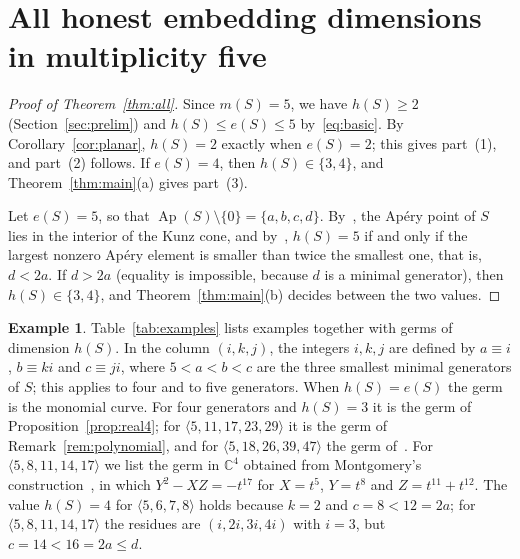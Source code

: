 \documentclass{amsart}
\theoremstyle{definition}
\newtheorem{example}[theorem]{Example}
\theoremstyle{remark}
\numberwithin{equation}{section}
\newcommand{\C}{\mathbb{C}}
\newcommand{\Ap}{\operatorname{Ap}}
\newcommand{\gen}[1]{\langle #1\rangle}
\begin{document}
\section{All honest embedding dimensions in multiplicity five}\label{sec:all}

\begin{proof}[Proof of Theorem~\textup{\ref{thm:all}}]
Since $m(S)=5$, we have $h(S)\ge2$ (Section~\ref{sec:prelim}) and $h(S)\le e(S)\le5$ by~\eqref{eq:basic}. By Corollary~\ref{cor:planar}, $h(S)=2$ exactly when $e(S)=2$; this gives part~(1), and part~(2) follows. If $e(S)=4$, then $h(S)\in\{3,4\}$, and Theorem~\ref{thm:main}(a) gives part~(3).

Let $e(S)=5$, so that $\Ap(S)\setminus\{0\}=\{a,b,c,d\}$. By~\cite[Proposition~1]{Mon}, the Ap\'ery point of $S$ lies in the interior of the Kunz cone, and by~\cite[Theorem~2]{Mon}, $h(S)=5$ if and only if the largest nonzero Ap\'ery element is smaller than twice the smallest one, that is, $d<2a$. If $d>2a$ (equality is impossible, because $d$ is a minimal generator), then $h(S)\in\{3,4\}$, and Theorem~\ref{thm:main}(b) decides between the two values.
\end{proof}

\begin{example}\label{ex:table}
Table~\ref{tab:examples} lists examples together with germs of dimension $h(S)$. In the column $(i,k,j)$, the integers $i,k,j$ are defined by $a\equiv i$, $b\equiv ki$ and $c\equiv ji$, where $5<a<b<c$ are the three smallest minimal generators of $S$; this applies to four and to five generators. When $h(S)=e(S)$ the germ is the monomial curve. For four generators and $h(S)=3$ it is the germ of Proposition~\ref{prop:real4}; for $\gen{5,11,17,23,29}$ it is the germ of Remark~\ref{rem:polynomial}, and for $\gen{5,18,26,39,47}$ the germ of~\cite[Example~2.17]{AGM}. For $\gen{5,8,11,14,17}$ we list the germ in $\C^4$ obtained from Montgomery's construction~\cite[Section~5.3]{Mon}, in which $Y^2-XZ=-t^{17}$ for $X=t^5$, $Y=t^8$ and $Z=t^{11}+t^{12}$. The value $h(S)=4$ for $\gen{5,6,7,8}$ holds because $k=2$ and $c=8<12=2a$; for $\gen{5,8,11,14,17}$ the residues are $(i,2i,3i,4i)$ with $i=3$, but $c=14<16=2a\le d$.
\end{example}
\end{document}

